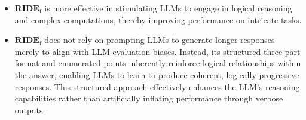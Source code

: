 \begin{itemize}
    \item $\textbf{RIDE}_{\text{f}}$ is more effective in stimulating LLMs to engage in logical reasoning and complex computations, thereby improving performance on intricate tasks.
    \item $\textbf{RIDE}_{\text{f}}$ does not rely on prompting LLMs to generate longer responses merely to align with LLM evaluation biases. Instead, its structured three-part format and enumerated points inherently reinforce logical relationships within the answer, enabling LLMs to learn to produce coherent, logically progressive responses. This structured approach effectively enhances the LLM’s reasoning capabilities rather than artificially inflating performance through verbose outputs.
\end{itemize}



